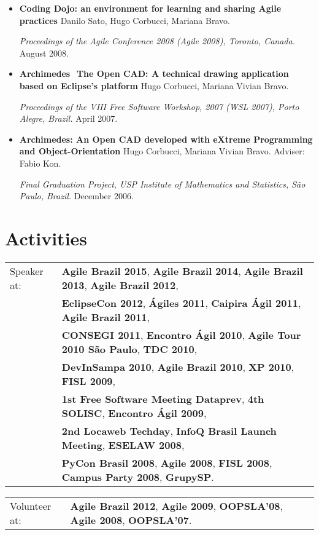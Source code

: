 \documentclass[letter,10pt]{article}
\begin{document}
\begin{itemize}
\item \textbf{Coding Dojo: an environment for learning and sharing
    Agile practices} Danilo Sato, Hugo Corbucci, Mariana Bravo.

  \textit{Proceedings of the Agile Conference 2008 (Agile 2008),
    Toronto, Canada.} August 2008.

\item \textbf{Archimedes ­ The Open CAD: A technical drawing
    application based on Eclipse's platform} Hugo Corbucci, Mariana
  Vivian Bravo.

  \textit{Proceedings of the VIII Free Software Workshop, 2007 (WSL
    2007), Porto Alegre, Brazil.} April 2007.

\item \textbf{Archimedes: An Open CAD developed with eXtreme
    Programming and Object-Orientation} Hugo Corbucci, Mariana Vivian
  Bravo. Adviser: Fabio Kon.

  \textit{Final Graduation Project, USP Institute of Mathematics and
    Statistics, São Paulo, Brazil.} December 2006.
\end{itemize}

\section{Activities}

\begin{tabular}{p{3cm}l}
  Speaker at: & \textbf{Agile Brazil 2015}, \textbf{Agile Brazil 2014}, \textbf{Agile Brazil 2013}, \textbf{Agile Brazil 2012},\\
  & \textbf{EclipseCon 2012}, \textbf{Ágiles 2011}, \textbf{Caipira Ágil 2011}, \textbf{Agile Brazil 2011},\\
  & \textbf{CONSEGI 2011}, \textbf{Encontro Ágil 2010}, \textbf{Agile Tour 2010 São Paulo}, \textbf{TDC 2010},\\
  & \textbf{DevInSampa 2010}, \textbf{Agile Brazil 2010}, \textbf{XP 2010}, \textbf{FISL 2009},\\
  & \textbf{1st Free Software Meeting Dataprev}, \textbf{4th SOLISC}, \textbf{Encontro Ágil 2009},\\
  & \textbf{2nd Locaweb Techday}, \textbf{InfoQ Brasil Launch Meeting}, \textbf{ESELAW 2008},\\
  & \textbf{PyCon Brasil 2008}, \textbf{Agile 2008}, \textbf{FISL 2008}, \textbf{Campus Party 2008}, \textbf{GrupySP}.
\end{tabular}

\begin{tabular}{p{3cm}l}
  Volunteer at: & \textbf{Agile Brazil 2012}, \textbf{Agile 2009}, \textbf{OOPSLA'08}, \textbf{Agile 2008}, \textbf{OOPSLA'07}.
\end{tabular}
\end{document}
